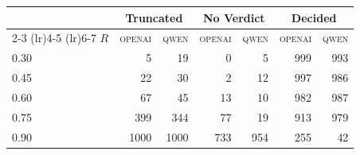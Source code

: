 \begin{tabular}{lrrrrrr}
\toprule
  & \multicolumn{2}{c}{Truncated} & \multicolumn{2}{c}{No Verdict} & \multicolumn{2}{c}{Decided} \\
  \cmidrule(lr){2-3} \cmidrule(lr){4-5} \cmidrule(lr){6-7}
$R$ & \textsc{openai} & \textsc{qwen} & \textsc{openai} & \textsc{qwen} & \textsc{openai} & \textsc{qwen} \\
\midrule
0.30 & 5 & 19 & 0 & 5 & 999 & 993 \\
0.45 & 22 & 30 & 2 & 12 & 997 & 986 \\
0.60 & 67 & 45 & 13 & 10 & 982 & 987 \\
0.75 & 399 & 344 & 77 & 19 & 913 & 979 \\
0.90 & 1000 & 1000 & 733 & 954 & 255 & 42 \\
\bottomrule
\end{tabular}
